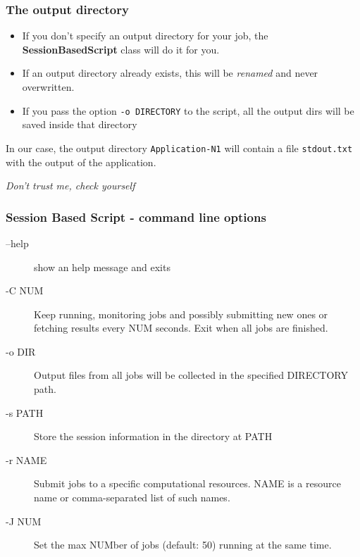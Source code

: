 \documentclass[english,serif,mathserif,xcolor=pdftex,dvipsnames,table]{beamer}
\begin{document}
\begin{frame}[fragile]
  \frametitle{The output directory}
  \begin{itemize}
  \item If you don't specify an output directory for your job, the
    \textbf{SessionBasedScript} class will do it for you.
  \item If an output directory already exists, this will be
    \textit{renamed} and never overwritten.
  \item If you pass the option \lstinline|-o DIRECTORY| to the script,
    all the output dirs will be saved inside that directory
  \end{itemize}

  In our case, the output directory \lstinline|Application-N1| will
  contain a file \lstinline|stdout.txt| with the output of the
  application.

  \pause\+
  \centering\textit{Don't trust me, check yourself}

\end{frame}

\begin{frame}
  \frametitle{Session Based Script - command line options}
  \begin{description}
  \item[--help] show an help message and exits
  \item[-C NUM] Keep running, monitoring jobs and possibly submitting
    new ones or fetching results every NUM seconds. Exit when all jobs
    are finished.
  \item[-o DIR] Output files from all jobs will be collected in the
    specified DIRECTORY path.
  \item[-s PATH] Store the session information in the directory at
    PATH
  \item[-r NAME] Submit jobs to a specific computational resources.
    NAME is a resource name or comma-separated list of such names.
  \item[-J NUM] Set the max NUMber of jobs (default: 50) running at
    the same time.

  \end{description}
\end{frame}
\end{document}
